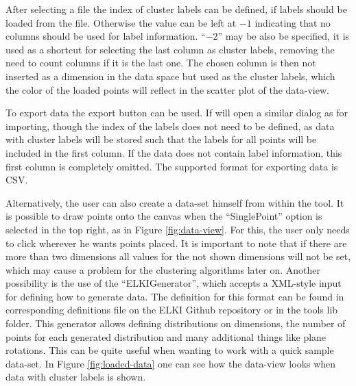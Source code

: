 \documentclass[
	a4paper,
	english,
	twoside,
	openright,               
	11pt                            
	]{report}
\begin{document}
After selecting a file the index of cluster labels can be defined, if labels should be loaded from the file. Otherwise the value can be left at $-1$ indicating that no columns should be used for label information. ``$-2$'' may be also be specified, it is used as a shortcut for selecting the last column as cluster labels, removing the need to count columns if it is the last one. The chosen column is then not inserted as a dimension in the data space but used as the cluster labels, which the color of the loaded points will reflect in the scatter plot of the data-view. 

To export data the export button can be used. If will open a similar dialog as for importing, though the index of the labels does not need to be defined, as data with cluster labels will be stored such that the labels for all points will be included in the first column. If the data does not contain label information, this first column is completely omitted. The supported format for exporting data is CSV.

Alternatively, the user can also create a data-set himself from within the tool. It is possible to draw points onto the canvas when the ``SinglePoint'' option is selected in the top right, as in Figure \ref{fig:data-view}. For this, the user only needs to click wherever he wants points placed. It is important to note that if there are more than two dimensions all values for the not shown dimensions will not be set, which may cause a problem for the clustering algorithms later on. Another possibility is the use of the ``ELKIGenerator'', which accepts a XML-style input for defining how to generate data. The definition for this format can be found in corresponding definitions file on the ELKI Github repository \cite{elkixml} or in the tools lib folder. This generator allows defining distributions on dimensions, the number of points for each generated distribution and many additional things like plane rotations. This can be quite useful when wanting to work with a quick sample data-set. In Figure \ref{fig:loaded-data} one can see how the data-view looks when data with cluster labels is shown. 
\end{document}
